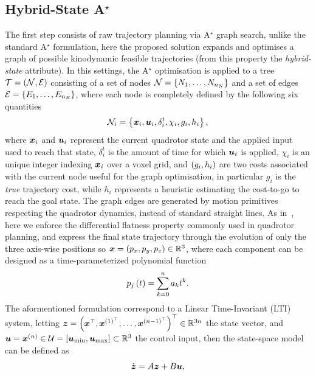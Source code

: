 \subsection{Hybrid-State A$^{\star}$}
The first step consists of raw trajectory planning via A$^{\star}$ graph search, unlike the standard A$^{\star}$ formulation, here
the proposed solution expands and optimises a graph of possible kinodynamic feasible trajectories (from this property the \emph{hybrid-state} attribute).
In this settings, the A$^{\star}$ optimisation is applied to a tree $\mathcal{T} = \left( \mathcal{N}, \mathcal{E} \right)$ consisting of a set of nodes
$\mathcal{N} = \left\{ N_1, \dots, N_{n_{N}} \right\}$ and a set of edges $\mathcal{E} = \left\{ E_1, \dots, E_{n_{E}} \right\}$, where each node
is completely defined by the following six quantities
\begin{equation*}
	\mathcal{N}_i = \left\{ \boldsymbol{x}_i, \boldsymbol{u}_i, \delta^t_i, \chi_i, g_i, h_i \right\},
\end{equation*}
where $\boldsymbol{x}_i$ and $\boldsymbol{u}_i$ represent the current quadrotor state and the applied input used to reach that state,
$\delta^t_i$ is the amount of time for which $\boldsymbol{u}_i$ is applied, $\chi_i$ is an unique integer indexing $\boldsymbol{x}_i$ over a voxel grid,
and $\left( g_i, h_i \right)$ are two costs associated with the current node useful for the graph optimisation, in particular $g_i$ is the
\emph{true} trajectory cost, while $h_i$ represents a heuristic estimating the cost-to-go to reach the goal state.
The graph edges are generated by motion primitives respecting the quadrotor dynamics, instead of standard straight lines.
As in~, here we enforce the differential flatness property commonly used in quadrotor planning,
and express the final state trajectory through the evolution of only the three axis-wise positions
so $\boldsymbol{x} = \left( p_x, p_y, p_z \right) \in \mathbb{R}^3$, where each component can be designed as a time-parameterized polynomial function
\begin{equation}
	\label{EQ:POLYNOMIAL-EXPANSION}
	p_j \left( t \right) = \sum_{k=0}^{n} a_kt^k.
\end{equation}
The aformentioned formulation correspond to a Linear Time-Invariant (LTI) system, letting
$\boldsymbol{z} = \left( \boldsymbol{x}^{\top}, \boldsymbol{x}^{{\left( 1 \right)}^{\top}}, \dots, \boldsymbol{x}^{{\left( n-1 \right)}^{\top}} \right)^{\top} \in \mathbb{R}^{3n}$  the state vector,
and $\boldsymbol{u} =  \boldsymbol{x}^{\left( n \right)} \in \mathcal{U} = \left[ \boldsymbol{u}_{\text{min}}, \boldsymbol{u}_{\text{max}}\right] \subset \mathbb{R}^{3}$ the control input,
then the state-space model can be defined as
\begin{equation*}
	\dot{\boldsymbol{z}} = A \boldsymbol{z} + B \boldsymbol{u},
\end{equation*}
